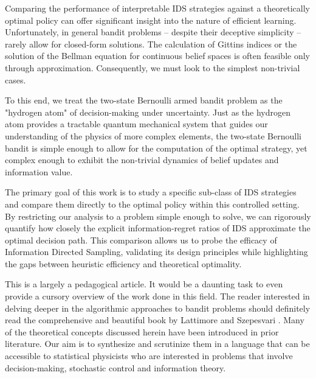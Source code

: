 \documentclass[aps,nofootinbib,groupaddress,superscriptaddress,reprint,amsmath,amssymb,graphicx,onecolumn,prx]{revtex4-2}
\begin{document}
 Comparing the performance of interpretable IDS strategies against a theoretically optimal policy can offer significant insight into the nature of efficient learning. Unfortunately, in general bandit problems -- despite their deceptive simplicity -- rarely allow for closed-form solutions. The calculation of Gittins indices \cite{gittins1979bandit} 
 or the solution of the Bellman equation for continuous belief spaces \cite{krishnamurthy2016pomdp} is often feasible only through approximation. Consequently, we must look to the simplest non-trivial cases.

To this end, we treat the two-state Bernoulli armed bandit problem as the "hydrogen atom" of decision-making under uncertainty. Just as the hydrogen atom provides a tractable quantum mechanical system that guides our understanding of the physics of more complex elements, the two-state Bernoulli bandit is simple enough to allow for the computation of the optimal strategy, yet complex enough to exhibit the non-trivial dynamics of belief updates and information value.

The primary goal of this work is to study a specific sub-class of IDS strategies and compare them directly to the optimal policy within this controlled setting. By restricting our analysis to a problem simple enough to solve, we can rigorously quantify how closely the explicit information-regret ratios of IDS approximate the optimal decision path. This comparison allows us to probe the efficacy of Information Directed Sampling, validating its design principles while highlighting the gaps between heuristic efficiency and theoretical optimality.

This is a largely a pedagogical article.  It would be a daunting task to even provide a cursory overview of the work done in this field. The reader interested in delving deeper in the algorithmic approaches to bandit problems should definitely read the comprehensive and beautiful book by Lattimore and Szepesvari \cite{Lattimore_Szepesvári_2020}. Many of the theoretical concepts discussed herein have been introduced in prior literature. Our aim is to synthesize and scrutinize them in a language that can be accessible to statistical physicists who are interested in problems that involve decision-making, stochastic control and information theory.
\end{document}
